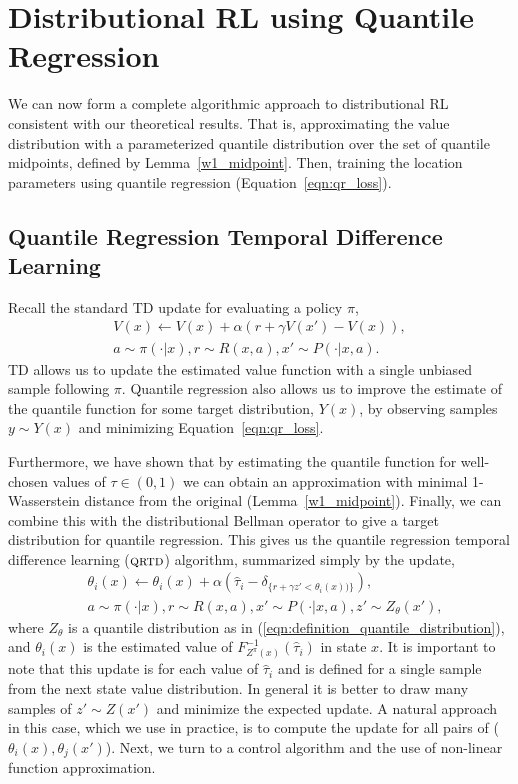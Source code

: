 \documentclass[letterpaper]{article}
\newcommand{\eqnref}[1]{(\ref{eqn:#1})}
\def \qrtd {\textsc{qrtd}}
\begin{document}
\section{Distributional RL using Quantile Regression}
We can now form a complete algorithmic approach to distributional RL consistent with our theoretical results. That is, approximating the value distribution with a parameterized quantile distribution over the set of quantile midpoints, defined by Lemma~\ref{w1_midpoint}. Then, training the location parameters using quantile regression (Equation~\ref{eqn:qr_loss}).

\subsection{Quantile Regression Temporal Difference Learning}

Recall the standard TD update for evaluating a policy $\pi$,
\begin{eqnarray}
    \nonumber V(x) \leftarrow V(x) + \alpha (r + \gamma V(x') - V(x)),\\
    \nonumber a \sim \pi(\cdot | x), r \sim R(x, a), x' \sim P(\cdot | x, a).
\end{eqnarray}
TD allows us to update the estimated value function with a single unbiased sample following $\pi$. Quantile regression also allows us to improve the estimate of the quantile function for some target distribution, $Y(x)$, by observing samples $y \sim Y(x)$ and minimizing Equation~\ref{eqn:qr_loss}.

Furthermore, we have shown that by estimating the quantile function for well-chosen values of $\tau \in (0, 1)$ we can obtain an approximation with minimal 1-Wasserstein distance from the original (Lemma~\ref{w1_midpoint}). Finally, we can combine this with the distributional Bellman operator to give a target distribution for quantile regression. This gives us the quantile regression temporal difference learning ($\qrtd$) algorithm, summarized simply by the update,
\begin{eqnarray}
    &\theta_i(x) \leftarrow \theta_i(x) + \alpha (\hat{\tau}_i - \delta_{\{r + \gamma z' < \theta_i(x))\} }),\\
    \nonumber &a \sim \pi(\cdot | x), r \sim R(x, a), x' \sim P(\cdot | x, a), z' \sim Z_\theta(x'),
\end{eqnarray}
where $Z_\theta$ is a quantile distribution as in \eqnref{definition_quantile_distribution}, and $\theta_i(x)$ is the estimated value of $F^{-1}_{Z^\pi(x)}(\hat \tau_i)$ in state $x$. It is important to note that this update is for each value of $\hat \tau_i$ and is defined for a single sample from the next state value distribution. In general it is better to draw many samples of $z' \sim Z(x')$ and minimize the expected update. A natural approach in this case, which we use in practice, is to compute the update for all pairs of ($\theta_i(x), \theta_j(x')$). Next, we turn to a control algorithm and the use of non-linear function approximation.
\end{document}
